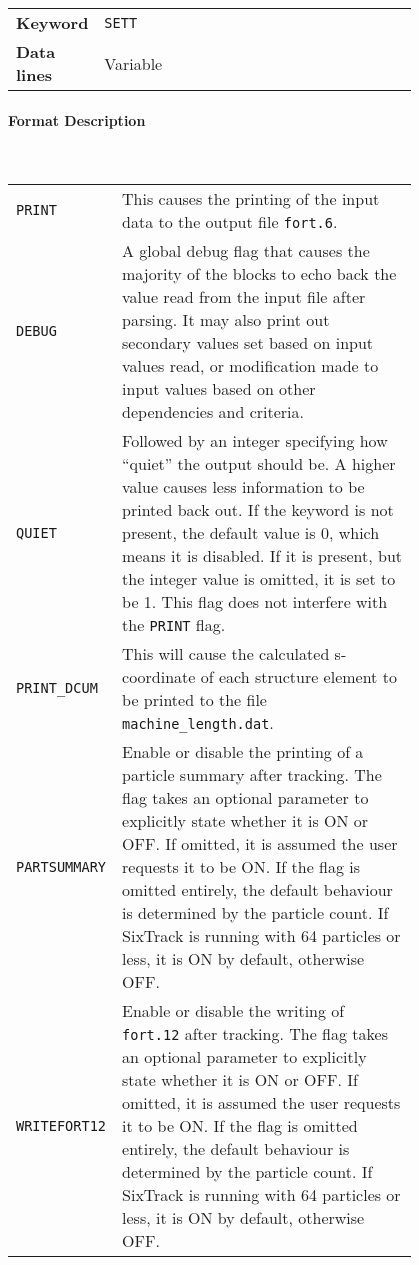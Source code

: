 \bigskip
\begin{tabular}{@{}lp{0.8\linewidth}}
    \textbf{Keyword}    & \texttt{SETT} \\
    \textbf{Data lines} & Variable
\end{tabular}

\paragraph{Format Description}~

\bigskip
\begin{tabular}{@{}lp{0.8\linewidth}}
    \texttt{PRINT} & This causes the printing of the input data to the output file \texttt{fort.6}. \\
    \texttt{DEBUG} & A global debug flag that causes the majority of the blocks to echo back the value read from the input file after parsing. It may also print out secondary values set based on input values read, or modification made to input values based on other dependencies and criteria.\index{DEBUG}\\
    \texttt{QUIET} & Followed by an integer specifying how ``quiet'' the output should be. A higher value causes less information to be printed back out. If the keyword is not present, the default value is 0, which means it is disabled. If it is present, but the integer value is omitted, it is set to be 1. This flag does not interfere with the \texttt{PRINT} flag.\index{QUIET}\\
    \texttt{PRINT\_DCUM} & This will cause the calculated s-coordinate of each structure element to be printed to the file \texttt{machine\_length.dat}. \\
    \texttt{PARTSUMMARY} & Enable or disable the printing of a particle summary after tracking. The flag takes an optional parameter to explicitly state whether it is ON or OFF. If omitted, it is assumed the user requests it to be ON. If the flag is omitted entirely, the default behaviour is determined by the particle count. If SixTrack is running with 64 particles or less, it is ON by default, otherwise OFF.\index{particle summary}\\
    \texttt{WRITEFORT12} & Enable or disable the writing of \texttt{fort.12} after tracking. The flag takes an optional parameter to explicitly state whether it is ON or OFF. If omitted, it is assumed the user requests it to be ON. If the flag is omitted entirely, the default behaviour is determined by the particle count. If SixTrack is running with 64 particles or less, it is ON by default, otherwise OFF.\index{fort.12}\\

\end{tabular}
